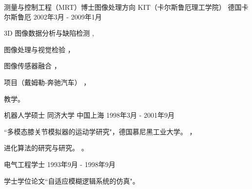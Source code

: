 \documentclass[../cv_xin_cn.tex]{subfiles}
\begin{document}
\begin{cventries}
  \cventry
    {测量与控制工程（MRT）博士\quad 图像处理方向} %
    {KIT（卡尔斯鲁厄理工学院）} %
    {德国卡尔斯鲁厄} %
    {2002年3月 - 2009年1月} %
    {
      \begin{cvitems} %
        \item 3D 图像数据分析与缺陷检测 \supercite{xin2008diss},
        \item 图像处理与视觉检验 \supercite{xin2009multiscale} \supercite{xin2007evaluation}，
        \item 图像传感器融合 \supercite{xin2004bildfolgenauswertung}，
        \item 项目（戴姆勒-奔驰汽车） \supercite{Xin_Daimler_08}，
        \item 教学。
      \end{cvitems}
    }

  \cventry
    {机器人学硕士} %
    {同济大学} %
    {中国上海} %
    {1998年3月 - 2001年9月} %
    {
      \begin{cvitems} %
        \item ``多模态膝关节模拟器的运动学研究"，德国慕尼黑工业大学。 \supercite{xin2002KneeSimulator}，
        \item 进化算法的研究与研究。 \supercite{xin2002AntColony}。
      \end{cvitems}
    }

  \cventry
    {电气工程学士} %
    {} %
    {} %
    {1993年9月 - 1998年9月} %
    {
      \begin{cvitems} %
        \item 学士学位论文``自适应模糊逻辑系统的仿真"。
      \end{cvitems}
    }

\end{cventries}
\end{document}
